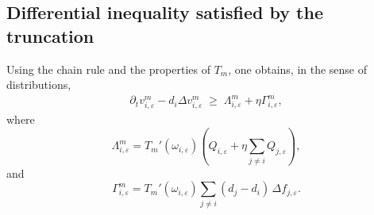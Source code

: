 \documentclass[a4paper,12pt,reqno]{amsart}
\theoremstyle{plain}
\numberwithin{equation}{section}
\begin{document}
	
	
	
	\subsection{Differential inequality satisfied by the truncation}
	
	Using the chain rule and the properties of $T_m$, one obtains, in the sense of
	distributions,
	\begin{align}\label{differential inequality weak form}
		\partial_t v^m_{i,\varepsilon}
		- d_i \Delta v^m_{i,\varepsilon}
		\;\ge\;
		\Lambda^m_{i,\varepsilon}
		+
		\eta\Gamma^m_{i,\varepsilon},
	\end{align}
	where
	\[
	\Lambda^m_{i,\varepsilon}
	=
	T_m'(\omega_{i,\varepsilon})
	\left(
	Q_{i,\varepsilon}
	+ \eta \sum_{j\ne i} Q_{j,\varepsilon}
	\right),
	\]
	and
	\[
	\Gamma^m_{i,\varepsilon}
	=
	T_m'(\omega_{i,\varepsilon})
	\sum_{j\ne i} (d_j-d_i)\, \Delta f_{j,\varepsilon}.
	\]
	
\end{document}
